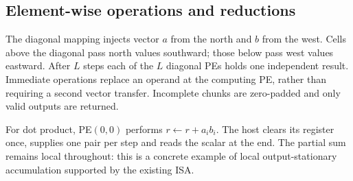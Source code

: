 \subsection{Element-wise operations and reductions}

The diagonal mapping injects vector $a$ from the north and $b$ from the west.
Cells above the diagonal pass north values southward; those below pass west
values eastward. After $L$ steps each of the $L$ diagonal PEs holds one
independent result. Immediate operations replace an operand at the computing
PE, rather than requiring a second vector transfer. Incomplete chunks are
zero-padded and only valid outputs are returned.

For dot product, PE$(0,0)$ performs $r\leftarrow r+a_i b_i$. The host clears
its register once, supplies one pair per step and reads the scalar at the end.
The partial sum remains local throughout: this is a concrete example of local
output-stationary accumulation supported by the existing ISA.
